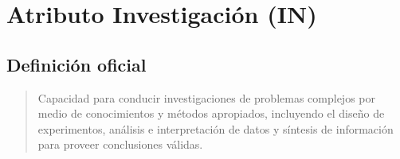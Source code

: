 \section*{Atributo Investigación (IN)}

\subsection*{Definición oficial}

\begin{quote}
Capacidad para conducir investigaciones de problemas complejos por medio de conocimientos y métodos apropiados, incluyendo el diseño de experimentos, análisis e interpretación de datos y síntesis de información para proveer conclusiones válidas.
\end{quote}

